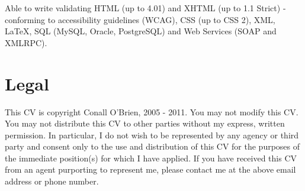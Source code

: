 \documentclass[a4paper, 11pt] {article}
\begin{document}
Able to write validating HTML (up to 4.01) and XHTML (up 
to 1.1 Strict) - conforming to accessibility guidelines (WCAG), CSS (up to 
CSS 2), XML, LaTeX, SQL (MySQL, Oracle, PostgreSQL) and Web Services 
(SOAP and XMLRPC).

\section*{Legal}

This CV is copyright Conall O'Brien, 2005 - 2011. You may not modify 
this CV. You may not distribute this CV to other parties without my 
express, written permission. In particular, I do not wish to be 
represented by any agency or third party and consent only to the use 
and distribution of this CV for the purposes of the immediate 
position(s) for which I have applied. If you have received this CV from 
an agent purporting to represent me, please contact me at the above 
email address or phone number.
\end{document}
